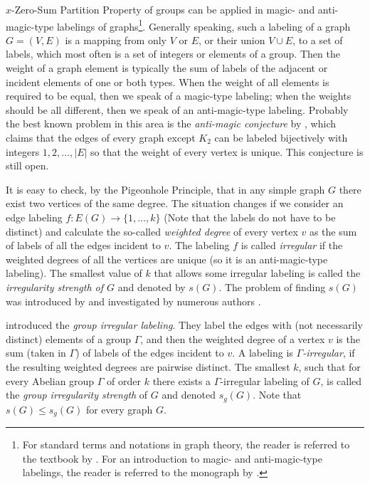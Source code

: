 \documentclass[final]{dmtcs-episciences}
\begin{document}
$x$-Zero-Sum Partition Property of groups can be applied in magic- and anti-magic-type labelings of graphs\footnote{For standard terms and notations in graph theory, the reader is referred to the textbook by \citet{Diestel}. For an introduction to magic- and anti-magic-type labelings, the reader is referred to the monograph by \citet{BMRS}.}. Generally speaking, such a labeling of a graph $G=(V,E)$ is a mapping from only $V$ or $E$, or their union $V\cup E$, to a set of labels, which most often is a set of integers or elements of a group. Then the weight of a graph element is typically the sum of labels of the adjacent or incident elements of one or both types. When the weight of all elements is required to be equal, then we speak of a magic-type labeling; when the weights should be all different, then we speak of an anti-magic-type labeling. Probably the best known problem in this area is the {\em anti-magic conjecture} by \citet{HR}, which claims that the edges of every graph except $K_2$ can be labeled bijectively with integers $1, 2, \dots, |E|$ so that the weight of every vertex is unique. This conjecture is still open. 

It is easy to check, by the Pigeonhole Principle, that in any simple graph $G$ there exist two vertices of the same degree. The situation changes if we consider an edge labeling $f:E(G)\rightarrow \{1, \ldots, k\}$ (Note that the labels do not have to be distinct) and calculate the so-called \textit{weighted degree} of every vertex $v$ as the sum of labels of all the edges incident to $v$. The labeling $f$ is called \textit{irregular} if the weighted degrees of all the vertices are unique (so it is an anti-magic-type labeling). The smallest value of $k$ that allows some irregular labeling is called the \textit{irregularity strength of $G$} and denoted by $s(G)$. The problem of finding $s(G)$ was introduced by \citet{ref:ChaJacLehOelRuiSab1} and investigated by numerous authors  \citep{ref:AigTri2,ref:AmaTog,ref:KalKarPfe1}. 

\citet{ref:AnhCic1} introduced the \textit{group irregular labeling}. They label the edges with (not necessarily distinct) elements of a group $\Gamma$, and then the weighted degree of a vertex  $v$ is the sum (taken in $\Gamma$) of labels of the edges incident to $v$. A labeling is \textit{$\Gamma$-irregular}, if the resulting weighted degrees are pairwise distinct. The smallest $k$, such that for every Abelian group $\Gamma$ of order $k$ there exists a $\Gamma$-irregular labeling of $G$, is called  the \textit{group irregularity strength} of $G$ and denoted $s_g(G)$. Note that $s(G)\leq s_g(G)$ for every graph $G$.
\end{document}
